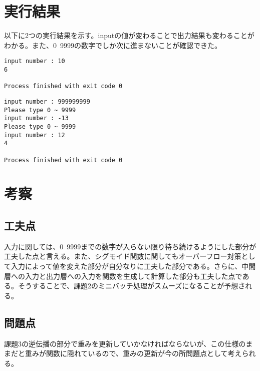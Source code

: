 \documentclass{ujarticle}
\begin{document}
\section{実行結果}
以下に2つの実行結果を示す。inputの値が変わることで出力結果も変わることがわかる。また、0~9999の数字でしか次に進まないことが確認できた。
\begin{lstlisting}[basicstyle=\ttfamily\footnotesize, frame=single]
input number : 10
6

Process finished with exit code 0
\end{lstlisting}

\begin{lstlisting}[basicstyle=\ttfamily\footnotesize, frame=single]
input number : 999999999
Please type 0 ~ 9999
input number : -13
Please type 0 ~ 9999
input number : 12
4

Process finished with exit code 0
\end{lstlisting}

\section{考察}
\subsection{工夫点}
入力に関しては、0~9999までの数字が入らない限り待ち続けるようにした部分が工夫した点と言える。また、シグモイド関数に関してもオーバーフロー対策として入力によって値を変えた部分が自分なりに工夫した部分である。さらに、中間層への入力と出力層への入力を関数を生成して計算した部分も工夫した点である。そうすることで、課題2のミニバッチ処理がスムーズになることが予想される。

\subsection{問題点}
課題3の逆伝播の部分で重みを更新していかなければならないが、この仕様のままだと重みが関数に隠れているので、重みの更新が今の所問題点として考えられる。
\end{document}
